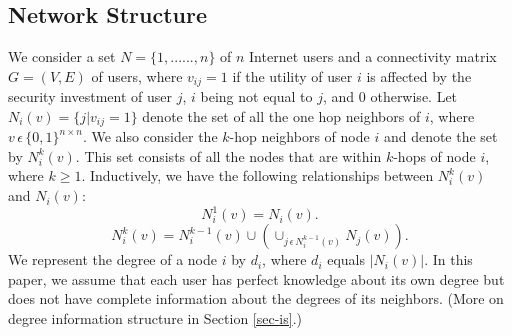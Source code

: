 \documentclass[letterpaper,12pt,onecolumn, nodraft]{IEEEtran}
\begin{document}
\subsection{Network Structure} \label{sec-ns}
We consider a set $N = \{1, ......, n\}$ of $n$ Internet users and a connectivity matrix $G = (V,E)$ of users, where $v_{ij} = 1$ if the utility of user $i$ is affected by the security investment of user $j$, $i$ being not equal to $j$, and 0 otherwise. Let $N_{i}(v) = \{j|v_{ij} = 1\}$ denote the set of all the one hop neighbors of $i$, where $v\,\epsilon\,\{0,1\}^{n \times n}$. We also consider the $k$-hop neighbors of node $i$ and denote the set by $N_{i}^{k}(v)$. This set consists of all the nodes that are within $k$-hops of node $i$, where $k\ge1$. Inductively,  we have the following relationships between $N_{i}^{k}(v)$ and $N_{i}(v)$:
\begin{equation}
N_{i}^{1}(v) = N_{i}(v).
\end{equation}
\begin{equation}
N_{i}^{k}(v) = N_{i}^{k - 1}(v) \cup (\cup_{j\,\epsilon\,N_{i}^{k - 1}(v)}N_{j}(v)).
\end{equation}
We represent the degree of a node $i$ by $d_{i}$, where $d_{i}$ equals $|N_{i}(v)|$. In this paper, we assume that each user has perfect knowledge about its own degree but does not have complete information about the degrees of its neighbors. (More on degree information structure in Section \ref{sec-is}.)
\end{document}
